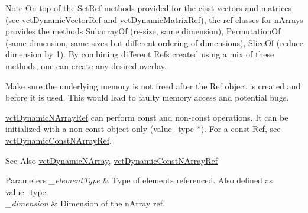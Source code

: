 \begin{DoxyNote}{Note}
On top of the Set\-Ref methods provided for the cisst vectors and matrices (see \hyperlink{classvct_dynamic_vector_ref}{vct\-Dynamic\-Vector\-Ref} and \hyperlink{classvct_dynamic_matrix_ref}{vct\-Dynamic\-Matrix\-Ref}), the ref classes for n\-Arrays provides the methods Subarray\-Of (re-\/size, same dimension), Permutation\-Of (same dimension, same sizes but different ordering of dimensions), Slice\-Of (reduce dimension by 1). By combining different Refs created using a mix of these methods, one can create any desired overlay.

Make sure the underlying memory is not freed after the Ref object is created and before it is used. This would lead to faulty memory access and potential bugs.

\hyperlink{classvct_dynamic_n_array_ref}{vct\-Dynamic\-N\-Array\-Ref} can perform const and non-\/const operations. It can be initialized with a non-\/const object only ({\ttfamily value\-\_\-type $\ast$}). For a const Ref, see \hyperlink{classvct_dynamic_const_n_array_ref}{vct\-Dynamic\-Const\-N\-Array\-Ref}.
\end{DoxyNote}
\begin{DoxySeeAlso}{See Also}
\hyperlink{classvct_dynamic_n_array}{vct\-Dynamic\-N\-Array}, \hyperlink{classvct_dynamic_const_n_array_ref}{vct\-Dynamic\-Const\-N\-Array\-Ref}
\end{DoxySeeAlso}

\begin{DoxyParams}{Parameters}
{\em \-\_\-element\-Type} & Type of elements referenced. Also defined as {\ttfamily value\-\_\-type}.\\
\hline
{\em \-\_\-dimension} & Dimension of the n\-Array ref. \\
\hline
\end{DoxyParams}


